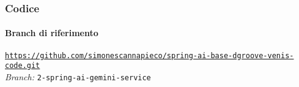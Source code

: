 %
\begin{frame}[fragile] \frametitle{Codice}
    \framesubtitle{Branch di riferimento}
	\begin{center}
		{\scriptsize \href{https://github.com/simonescannapieco/spring-ai-base-dgroove-venis-code.git}{\texttt{https://github.com/simonescannapieco/spring-ai-base-dgroove-venis-code.git}}}\\
		\textit{Branch:} \alert{\texttt{2-spring-ai-gemini-service}}
	\end{center}
\end{frame}